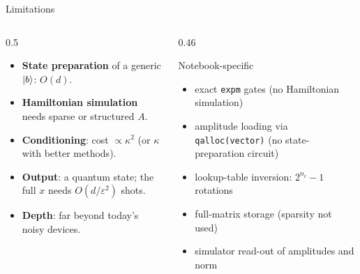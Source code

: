 \documentclass[aspectratio=169,11pt]{beamer}
\newcommand{\key}[1]{{\color{qdark}\textbf{#1}}}
\begin{document}
\begin{frame}{Limitations}
  \begin{columns}[T]
    \begin{column}{0.5\textwidth}
      \small
      \begin{itemize}
        \item \key{State preparation} of a generic $\ket b$: $O(d)$.
        \item \key{Hamiltonian simulation} needs sparse or structured $A$.
        \item \key{Conditioning}: cost $\propto\kappa^2$ (or $\kappa$ with better methods).
        \item \key{Output}: a quantum state; the full $x$ needs $O(d/\varepsilon^2)$ shots.
        \item \key{Depth}: far beyond today's noisy devices.
      \end{itemize}
    \end{column}
    \begin{column}{0.46\textwidth}
      \begin{block}{Notebook-specific}
        \small
        \begin{itemize}
          \item exact \texttt{expm} gates (no Hamiltonian simulation)
          \item amplitude loading via \texttt{qalloc(vector)} (no state-preparation circuit)
          \item lookup-table inversion: $2^{n_c} - 1$ rotations
          \item full-matrix storage (sparsity not used)
          \item simulator read-out of amplitudes and norm
        \end{itemize}
      \end{block}
    \end{column}
  \end{columns}
\end{frame}
\end{document}
